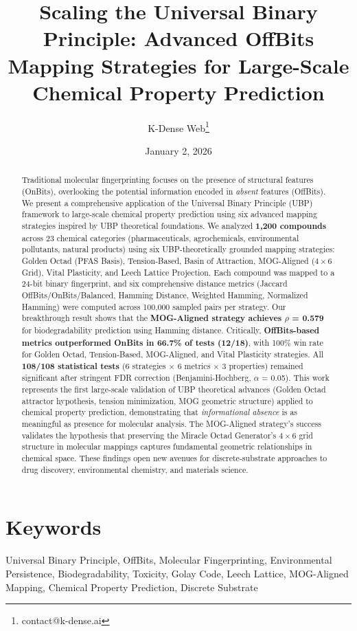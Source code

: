 \documentclass[11pt,letterpaper]{article}
\title{\textbf{Scaling the Universal Binary Principle: Advanced OffBits Mapping Strategies for Large-Scale Chemical Property Prediction}}
\author{K-Dense Web\thanks{contact@k-dense.ai}}
\date{January 2, 2026}
\begin{document}
\maketitle

\begin{abstract}
\noindent Traditional molecular fingerprinting focuses on the presence of structural features (OnBits), overlooking the potential information encoded in \textit{absent} features (OffBits). We present a comprehensive application of the Universal Binary Principle (UBP) framework to large-scale chemical property prediction using six advanced mapping strategies inspired by UBP theoretical foundations. We analyzed \textbf{1,200 compounds} across 23 chemical categories (pharmaceuticals, agrochemicals, environmental pollutants, natural products) using six UBP-theoretically grounded mapping strategies: Golden Octad (PFAS Basis), Tension-Based, Basin of Attraction, MOG-Aligned ($4\times6$ Grid), Vital Plasticity, and Leech Lattice Projection. Each compound was mapped to a 24-bit binary fingerprint, and six comprehensive distance metrics (Jaccard OffBits/OnBits/Balanced, Hamming Distance, Weighted Hamming, Normalized Hamming) were computed across 100,000 sampled pairs per strategy. Our breakthrough result shows that the \textbf{MOG-Aligned strategy achieves $\rho$ = 0.579} for biodegradability prediction using Hamming distance. Critically, \textbf{OffBits-based metrics outperformed OnBits in 66.7\% of tests (12/18)}, with 100\% win rate for Golden Octad, Tension-Based, MOG-Aligned, and Vital Plasticity strategies. All \textbf{108/108 statistical tests} (6 strategies $\times$ 6 metrics $\times$ 3 properties) remained significant after stringent FDR correction (Benjamini-Hochberg, $\alpha$ = 0.05). This work represents the first large-scale validation of UBP theoretical advances (Golden Octad attractor hypothesis, tension minimization, MOG geometric structure) applied to chemical property prediction, demonstrating that \textit{informational absence} is as meaningful as presence for molecular analysis. The MOG-Aligned strategy's success validates the hypothesis that preserving the Miracle Octad Generator's $4\times6$ grid structure in molecular mappings captures fundamental geometric relationships in chemical space. These findings open new avenues for discrete-substrate approaches to drug discovery, environmental chemistry, and materials science.
\end{abstract}

\section*{Keywords}
Universal Binary Principle, OffBits, Molecular Fingerprinting, Environmental Persistence, Biodegradability, Toxicity, Golay Code, Leech Lattice, MOG-Aligned Mapping, Chemical Property Prediction, Discrete Substrate
\end{document}
